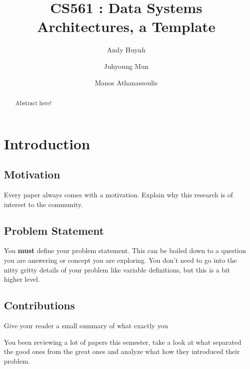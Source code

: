 \documentclass[sigconf]{acmart}
\begin{document}
\title{CS561 : Data Systems Architectures, a Template}

\author{Andy Huynh}
\author{Juhyoung Mun}
\author{Manos Athanassoulis}

\begin{abstract}
    Abstract here! 
\end{abstract}

\maketitle

\section{Introduction}

\subsection{Motivation}

Every paper always comes with a motivation. Explain why this research is of interest
to the community.

\subsection{Problem Statement}

You \textbf{must} define your problem statement. This can be boiled down to a 
question you are answering or concept you are exploring. You don't need to go into
the nitty gritty details of your problem like variable definitions, but this is a
bit higher level.

\subsection{Contributions}

Give your reader a small summary of what exactly you 

You been reviewing a lot of papers this semester, take a look at what separated
the good ones from the great ones and analyze what how they introduced their
problem.


\end{document}
